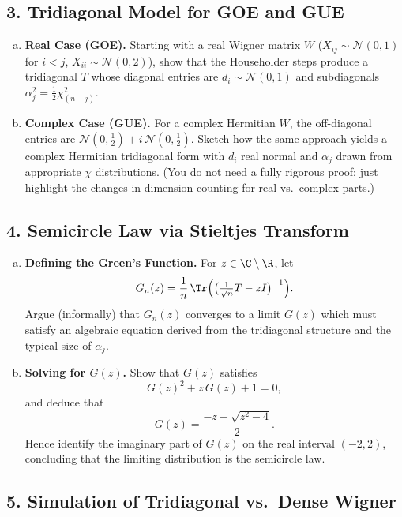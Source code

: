\documentclass[letterpaper,11pt,oneside,reqno]{article}
\numberwithin{equation}{section}
\theoremstyle{definition}
\begin{document}
\subsection*{3. Tridiagonal Model for GOE and GUE}

\begin{enumerate}[(a)]
\item {\bf Real Case (GOE).} Starting with a real Wigner matrix $W$ ($X_{ij}\sim \mathcal{N}(0,1)$ for $i<j$, $X_{ii}\sim \mathcal{N}(0,2)$), show that the Householder steps produce a tridiagonal $T$ whose diagonal entries are $d_i\sim \mathcal{N}(0,1)$ and subdiagonals $\alpha_j^2 = \frac12 \chi^2_{(n-j)}$.
\item {\bf Complex Case (GUE).} For a complex Hermitian $W$, the off-diagonal entries are $\mathcal{N}(0,\tfrac12)+ i\,\mathcal{N}(0,\tfrac12)$. Sketch how the same approach yields a complex Hermitian tridiagonal form with $d_i$ real normal and $\alpha_j$ drawn from appropriate $\chi$ distributions. (You do not need a fully rigorous proof; just highlight the changes in dimension counting for real vs.\ complex parts.)
\end{enumerate}

\subsection*{4. Semicircle Law via Stieltjes Transform}

\begin{enumerate}[(a)]
\item {\bf Defining the Green’s Function.} For $z\in \C\setminus\R$, let
\[
  G_n(z) = \frac{1}{n} \,\Tr\Bigl(\bigl(\tfrac1{\sqrt{n}} T - z I\bigr)^{-1}\Bigr).
\]
Argue (informally) that $G_n(z)$ converges to a limit $G(z)$ which must satisfy an algebraic equation derived from the tridiagonal structure and the typical size of $\alpha_j$.
\item {\bf Solving for $G(z)$.} Show that $G(z)$ satisfies
\[
  G(z)^2 + z\,G(z) + 1 = 0,
\]
and deduce that
\[
  G(z) = \frac{-z + \sqrt{z^2-4}}{2}.
\]
Hence identify the imaginary part of $G(z)$ on the real interval $(-2,2)$, concluding that the limiting distribution is the semicircle law.
\end{enumerate}

\subsection*{5. Simulation of Tridiagonal vs.\ Dense Wigner}
\end{document}
